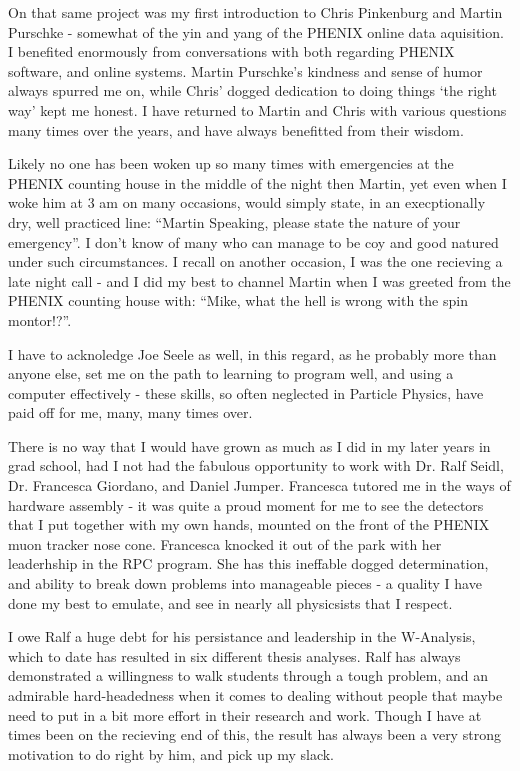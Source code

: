 On that same project was my first introduction to Chris Pinkenburg and Martin
Purschke - somewhat of the yin and yang of the PHENIX online data aquisition. I
benefited enormously from conversations with both regarding PHENIX software,
and online systems. Martin Purschke's kindness and sense of humor always
spurred me on, while Chris' dogged dedication to doing things `the right way'
kept me honest. I have returned to Martin and Chris with various questions many
times over the years, and have always benefitted from their wisdom.

Likely no one has been woken up so many times with emergencies at the PHENIX
counting house in the middle of the night then Martin, yet even when I woke him
at 3 am on many occasions, would simply state, in an execptionally dry, well
practiced line: ``Martin Speaking, please state the nature of your emergency''. I
don't know of many who can manage to be coy and good natured under such
circumstances. I recall on another occasion, I was the one recieving a late
night call - and I did my best to channel Martin when I was greeted from the
PHENIX counting house with: ``Mike, what the hell is wrong with the spin
montor!?''.

I have to acknoledge Joe Seele as well, in this regard, as he probably more
than anyone else, set me on the path to learning to program well, and using a
computer effectively - these skills, so often neglected in Particle Physics,
have paid off for me, many, many times over.

There is no way that I would have grown as much as I did in my later years in
grad school, had I not had the fabulous opportunity to work with Dr. Ralf
Seidl, Dr. Francesca Giordano, and Daniel Jumper. Francesca tutored me in the
ways of hardware assembly - it was quite a proud moment for me to see the
detectors that I put together with my own hands, mounted on the front of the
PHENIX muon tracker nose cone. Francesca knocked it out of the park with her
leaderhship in the RPC program. She has this ineffable dogged determination,
and ability to break down problems into manageable pieces - a quality I have
done my best to emulate, and see in nearly all physicsists that I respect.

I owe Ralf a huge debt for his persistance and leadership in the W-Analysis,
which to date has resulted in six different thesis analyses. Ralf has always
demonstrated a willingness to walk students through a tough problem, and an
admirable hard-headedness when it comes to dealing without people that maybe
need to put in a bit more effort in their research and work. Though I have at
times been on the recieving end of this, the result has always been a very
strong motivation to do right by him, and pick up my slack.

